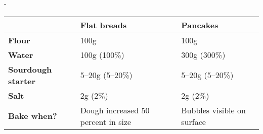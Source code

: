 -\begin{tabular}{lll}
\toprule
                           & \textbf{Flat breads}               & \textbf{Pancakes}          \\ \midrule
\textbf{Flour}             & 100g                               & 100g                       \\ 
\textbf{Water}             & 100g (100\%)                       & 300g (300\%)               \\ 
\textbf{Sourdough starter} & 5--20g (5--20\%)                   & 5--20g (5--20\%)           \\ 
\textbf{Salt}              & 2g (2\%)                           & 2g (2\%)                   \\ 
\textbf{Bake when?}        & Dough increased 50 percent in size & Bubbles visible on surface \\ \bottomrule
\bottomrule
\end{tabular}
